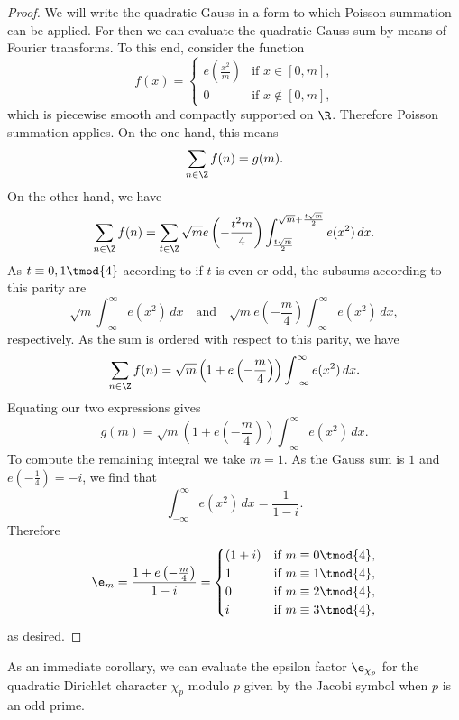 \documentclass[12pt]{article}
\begin{document}
      \begin{proof}
        We will write the quadratic Gauss in a form to which Poisson summation can be applied. For then we can evaluate the quadratic Gauss sum by means of Fourier transforms. To this end, consider the function
        \[
          f(x) = \begin{cases} e\left(\frac{x^{2}}{m}\right) & \text{if \(x \in [0,m]\),} \\ 0 & \text{if \(x \notin [0,m]\),} \end{cases}
        \]
        which is piecewise smooth and compactly supported on \(\R\). Therefore Poisson summation applies. On the one hand, this means
        \[
          \sum_{n \in \Z}f(n) = g(m).
        \]
        On the other hand, we have
        \[
          \sum_{n \in \Z}f(n) = \sum_{t \in \Z}\sqrt{m}e\left(-\frac{t^{2}m}{4}\right)\int_{\frac{t\sqrt{m}}{2}}^{\sqrt{m}+\frac{t\sqrt{m}}{2}}e(x^{2})\,dx.
        \]
        As \(t \equiv 0,1 \tmod{4}\) according to if \(t\) is even or odd, the subsums according to this parity are
        \[
          \sqrt{m}\int_{-\infty}^{\infty}e(x^{2})\,dx \quad \text{and} \quad \sqrt{m}e\left(-\frac{m}{4}\right)\int_{-\infty}^{\infty}e(x^{2})\,dx,
        \]
        respectively. As the sum is ordered with respect to this parity, we have
        \[
          \sum_{n \in \Z}f(n) = \sqrt{m}\left(1+e\left(-\frac{m}{4}\right)\right)\int_{-\infty}^{\infty}e(x^{2})\,dx.
        \]
        Equating our two expressions gives
        \[
          g(m) = \sqrt{m}\left(1+e\left(-\frac{m}{4}\right)\right)\int_{-\infty}^{\infty}e(x^{2})\,dx.
        \]
        To compute the remaining integral we take \(m = 1\). As the Gauss sum is \(1\) and \(e\left(-\frac{1}{4}\right) = -i\), we find that
        \[
          \int_{-\infty}^{\infty}e(x^{2})\,dx = \frac{1}{1-i}.
        \]
        Therefore
        \[
          \e_{m} = \frac{1+e\left(-\frac{m}{4}\right)}{1-i} = \begin{cases} (1+i) & \text{if \(m \equiv 0 \tmod{4}\)}, \\ 1 & \text{if \(m \equiv 1 \tmod{4}\)}, \\ 0 & \text{if \(m \equiv 2 \tmod{4}\)}, \\ i & \text{if \(m \equiv 3 \tmod{4}\)}, \end{cases}
        \]
        as desired.
      \end{proof}

      As an immediate corollary, we can evaluate the epsilon factor \(\e_{\chi_{p}}\) for the quadratic Dirichlet character \(\chi_{p}\) modulo \(p\) given by the Jacobi symbol when \(p\) is an odd prime.
\end{document}
